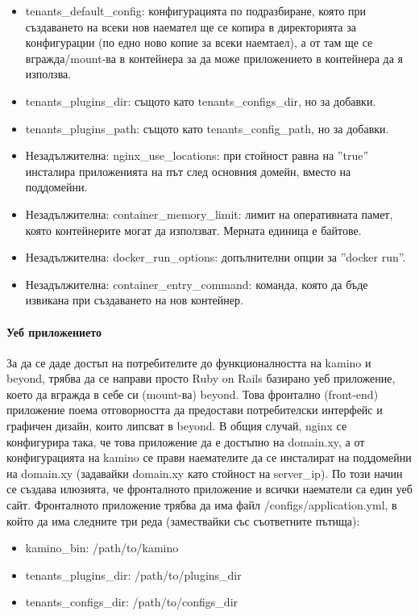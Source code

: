 \documentclass[pdftex,14pt,a4paper]{extreport}
\begin{document}
\begin{itemize}
  \item tenants\_default\_config: конфигурацията по подразбиране, която при създаването на всеки нов наемател ще се копира в директорията за конфигурации (по едно ново копие за всеки наемтаел), а от там ще се вгражда/mount-ва в контейнера за да може приложението в контейнера да я използва.
  \item tenants\_plugins\_dir: същото като tenants\_configs\_dir, но за добавки.
  \item tenants\_plugins\_path: същото като tenants\_config\_path, но за добавки.
  \item Незадължителна: nginx\_use\_locations: при стойност равна на ''true'' инсталира приложенията на път след основния домейн, вместо на поддомейни.
  \item Незадължителна: container\_memory\_limit: лимит на оперативната памет, която контейнерите могат да използват. Мерната единица е байтове.
  \item Незадължителна: docker\_run\_options: допълнителни опции за ''docker run''.
  \item Незадължителна: container\_entry\_command: команда, която да бъде извикана при създаването на нов контейнер.
\end{itemize}
\paragraph {Уеб приложението\\}
За да се даде достъп на потребителите до функционалността на kamino и beyond, трябва да се направи просто Ruby on Rails базирано уеб приложение, което да вгражда в себе си (mount-ва) beyond. Това фронтално (front-end) приложение поема отговорността да предостави потребителски интерфейс и графичен дизайн, които липсват в beyond. В общия случай, nginx се конфигурира така, че това приложение да е достъпно на domain.xy, а от конфигурацията на kamino се прави наемателите да се инсталират на поддомейни на domain.xy (задавайки domain.xy като стойност на server\_ip). По този начин се създава илюзията, че фронталното приложение и всички наематели са един уеб сайт. Фронталното приложение трябва да има файл /configs/application.yml, в който да има следните три реда (замествайки със съответните пътища):
\begin{itemize}
  \item kamino\_bin: /path/to/kamino
  \item tenants\_plugins\_dir: /path/to/plugins\_dir
  \item tenants\_configs\_dir: /path/to/configs\_dir
\end{itemize}
\end{document}
